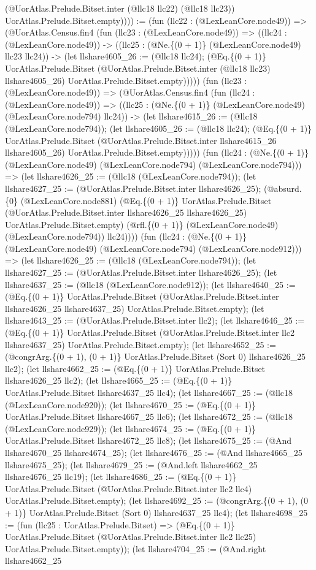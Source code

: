 \documentclass[11pt]{article}
\begin{document}
(@UorAtlas.Prelude.Bitset.inter (@llc18 llc22) (@llc18 llc23)) UorAtlas.Prelude.Bitset.empty)))) := (fun (llc22 : (@LexLeanCore.node49)) => (@UorAtlas.Census.fin4 (fun (llc23 : (@LexLeanCore.node49)) => ((llc24 : (@LexLeanCore.node49)) -> ((llc25 : (@Ne.\{(0 + 1)\} (@LexLeanCore.node49) llc23 llc24)) -> (let llshare4605\_26 := (@llc18 llc24); (@Eq.\{(0 + 1)\} UorAtlas.Prelude.Bitset (@UorAtlas.Prelude.Bitset.inter (@llc18 llc23) llshare4605\_26) UorAtlas.Prelude.Bitset.empty))))) (fun (llc23 : (@LexLeanCore.node49)) => (@UorAtlas.Census.fin4 (fun (llc24 : (@LexLeanCore.node49)) => ((llc25 : (@Ne.\{(0 + 1)\} (@LexLeanCore.node49) (@LexLeanCore.node794) llc24)) -> (let llshare4615\_26 := (@llc18 (@LexLeanCore.node794)); (let llshare4605\_26 := (@llc18 llc24); (@Eq.\{(0 + 1)\} UorAtlas.Prelude.Bitset (@UorAtlas.Prelude.Bitset.inter llshare4615\_26 llshare4605\_26) UorAtlas.Prelude.Bitset.empty))))) (fun (llc24 : (@Ne.\{(0 + 1)\} (@LexLeanCore.node49) (@LexLeanCore.node794) (@LexLeanCore.node794))) => (let llshare4626\_25 := (@llc18 (@LexLeanCore.node794)); (let llshare4627\_25 := (@UorAtlas.Prelude.Bitset.inter llshare4626\_25); (@absurd.\{0\} (@LexLeanCore.node881) (@Eq.\{(0 + 1)\} UorAtlas.Prelude.Bitset (@UorAtlas.Prelude.Bitset.inter llshare4626\_25 llshare4626\_25) UorAtlas.Prelude.Bitset.empty) (@rfl.\{(0 + 1)\} (@LexLeanCore.node49) (@LexLeanCore.node794)) llc24)))) (fun (llc24 : (@Ne.\{(0 + 1)\} (@LexLeanCore.node49) (@LexLeanCore.node794) (@LexLeanCore.node912))) => (let llshare4626\_25 := (@llc18 (@LexLeanCore.node794)); (let llshare4627\_25 := (@UorAtlas.Prelude.Bitset.inter llshare4626\_25); (let llshare4637\_25 := (@llc18 (@LexLeanCore.node912)); (let llshare4640\_25 := (@Eq.\{(0 + 1)\} UorAtlas.Prelude.Bitset (@UorAtlas.Prelude.Bitset.inter llshare4626\_25 llshare4637\_25) UorAtlas.Prelude.Bitset.empty); (let llshare4643\_25 := (@UorAtlas.Prelude.Bitset.inter llc2); (let llshare4646\_25 := (@Eq.\{(0 + 1)\} UorAtlas.Prelude.Bitset (@UorAtlas.Prelude.Bitset.inter llc2 llshare4637\_25) UorAtlas.Prelude.Bitset.empty); (let llshare4652\_25 := (@congrArg.\{(0 + 1), (0 + 1)\} UorAtlas.Prelude.Bitset (Sort 0) llshare4626\_25 llc2); (let llshare4662\_25 := (@Eq.\{(0 + 1)\} UorAtlas.Prelude.Bitset llshare4626\_25 llc2); (let llshare4665\_25 := (@Eq.\{(0 + 1)\} UorAtlas.Prelude.Bitset llshare4637\_25 llc4); (let llshare4667\_25 := (@llc18 (@LexLeanCore.node920)); (let llshare4670\_25 := (@Eq.\{(0 + 1)\} UorAtlas.Prelude.Bitset llshare4667\_25 llc6); (let llshare4672\_25 := (@llc18 (@LexLeanCore.node929)); (let llshare4674\_25 := (@Eq.\{(0 + 1)\} UorAtlas.Prelude.Bitset llshare4672\_25 llc8); (let llshare4675\_25 := (@And llshare4670\_25 llshare4674\_25); (let llshare4676\_25 := (@And llshare4665\_25 llshare4675\_25); (let llshare4679\_25 := (@And.left llshare4662\_25 llshare4676\_25 llc19); (let llshare4686\_25 := (@Eq.\{(0 + 1)\} UorAtlas.Prelude.Bitset (@UorAtlas.Prelude.Bitset.inter llc2 llc4) UorAtlas.Prelude.Bitset.empty); (let llshare4692\_25 := (@congrArg.\{(0 + 1), (0 + 1)\} UorAtlas.Prelude.Bitset (Sort 0) llshare4637\_25 llc4); (let llshare4698\_25 := (fun (llc25 : UorAtlas.Prelude.Bitset) => (@Eq.\{(0 + 1)\} UorAtlas.Prelude.Bitset (@UorAtlas.Prelude.Bitset.inter llc2 llc25) UorAtlas.Prelude.Bitset.empty)); (let llshare4704\_25 := (@And.right llshare4662\_25 
\end{document}

